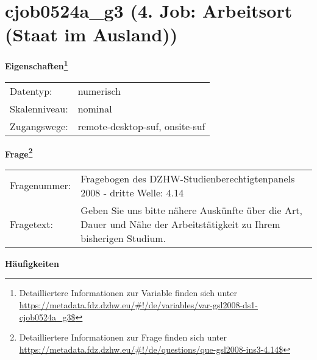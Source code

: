 
    \setcounter{footnote}{0}

    \vspace*{-1.8cm}
	\section{cjob0524a\_g3 (4. Job: Arbeitsort (Staat im Ausland))}
	\label{section:cjob0524a_g3}



    \vspace*{0.5cm}
    \noindent\textbf{Eigenschaften\footnote{Detailliertere Informationen zur Variable finden sich unter
		\url{https://metadata.fdz.dzhw.eu/\#!/de/variables/var-gsl2008-ds1-cjob0524a_g3$}}}\\
	\begin{tabularx}{\hsize}{@{}lX}
	Datentyp: & numerisch \\
	Skalenniveau: & nominal \\
	Zugangswege: &
	  remote-desktop-suf, 
	  onsite-suf
 \\
    \end{tabularx}



				\vspace*{0.5cm}
                \noindent\textbf{Frage\footnote{Detailliertere Informationen zur Frage finden sich unter
		              \url{https://metadata.fdz.dzhw.eu/\#!/de/questions/que-gsl2008-ins3-4.14$}}}\\
				\begin{tabularx}{\hsize}{@{}lX}
					Fragenummer: &
					  Fragebogen des DZHW-Studienberechtigtenpanels 2008 - dritte Welle:
					  4.14
 \\
					Fragetext: & Geben Sie uns bitte nähere Auskünfte über die Art, Dauer und Nähe der Arbeitstätigkeit zu Ihrem bisherigen Studium. \\
				\end{tabularx}





        		\vspace*{0.5cm}
                \noindent\textbf{Häufigkeiten}

